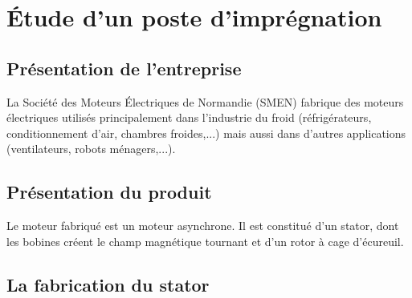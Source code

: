 \begin{center}
\end{center}

\newpage

\section{Étude d'un poste d'imprégnation}

\subsection{Présentation de l'entreprise}

La Société des Moteurs Électriques de Normandie (SMEN) fabrique des moteurs électriques utilisés principalement dans l'industrie du froid (réfrigérateurs, conditionnement d'air, chambres froides,...) mais aussi dans d'autres applications (ventilateurs, robots ménagers,...).

\subsection{Présentation du produit}

Le moteur fabriqué est un moteur asynchrone. Il est constitué d'un stator, dont les bobines créent le champ magnétique tournant et d'un rotor à cage d'écureuil.

\subsection{La fabrication du stator}

